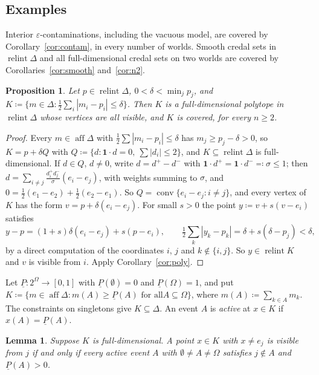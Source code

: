 \documentclass[11pt]{article}
\newcommand{\one}{\mathbf{1}}
\DeclareMathOperator{\conv}{conv}
\DeclareMathOperator{\relint}{relint}
\DeclareMathOperator{\aff}{aff}
\theoremstyle{plain}
\newtheorem{proposition}[theorem]{Proposition}
\newtheorem{lemma}[theorem]{Lemma}
\theoremstyle{definition}
\theoremstyle{remark}
\begin{document}
\subsection{Examples}\label{sec:examples}

Interior $\varepsilon$-contaminations, including the vacuous model, are covered by
Corollary~\ref{cor:contam}, in every number of worlds. Smooth credal sets in
$\relint\Delta$ and all full-dimensional credal sets on two worlds are covered by
Corollaries~\ref{cor:smooth} and~\ref{cor:n2}.

\begin{proposition}\label{prop:tv}
Let $p\in\relint\Delta$, $0<\delta<\min_jp_j$, and $K\coloneqq\{m\in\Delta:\frac12\sum_i
|m_i-p_i|\le\delta\}$. Then $K$ is a full-dimensional polytope in $\relint\Delta$ whose
vertices are all visible, and $K$ is covered, for every $n\ge2$.
\end{proposition}

\begin{proof}
Every $m\in\aff\Delta$ with $\frac12\sum|m_i-p_i|\le\delta$ has $m_j\ge p_j-\delta>0$, so
$K=p+\delta Q$ with $Q\coloneqq\{d:\one\cdot d=0,\ \sum|d_i|\le2\}$, and $K\subseteq
\relint\Delta$ is full-dimensional. If $d\in Q$, $d\ne0$, write $d=d^+-d^-$ with
$\one\cdot d^+=\one\cdot d^-\eqqcolon\sigma\le1$; then $d=\sum_{i\neq j}\frac{d^+_id^-_j}\sigma
(e_i-e_j)$, with weights summing to $\sigma$, and $0=\frac12(e_1-e_2)+\frac12(e_2-e_1)$.
So $Q=\conv\{e_i-e_j:i\neq j\}$, and every vertex of $K$ has the form $v=p+\delta(e_i-e_j)$.
For small $s>0$ the point $y\coloneqq v+s(v-e_i)$ satisfies
\[
  y-p=(1+s)\delta(e_i-e_j)+s(p-e_i),\qquad
  \tfrac12\textstyle\sum_k|y_k-p_k|=\delta+s(\delta-p_j)<\delta ,
\]
by a direct computation of the coordinates $i$, $j$ and $k\notin\{i,j\}$. So $y\in\relint K$
and $v$ is visible from $i$. Apply Corollary~\ref{cor:poly}.
\end{proof}

Let $\underline P:2^\Omega\to[0,1]$ with $\underline P(\emptyset)=0$ and $\underline
P(\Omega)=1$, and put $K\coloneqq\{m\in\aff\Delta:m(A)\ge\underline P(A)\text{ for all
}A\subseteq\Omega\}$, where $m(A)\coloneqq\sum_{k\in A}m_k$. The constraints on singletons
give $K\subseteq\Delta$. An event $A$ is \emph{active} at $x\in K$ if $x(A)=\underline
P(A)$.

\begin{lemma}\label{lem:events}
Suppose $K$ is full-dimensional. A point $x\in K$ with $x\neq e_j$ is visible from $j$ if
and only if every active event $A$ with $\emptyset\neq A\neq\Omega$ satisfies $j\notin A$
and $\underline P(A)>0$.
\end{lemma}
\end{document}
